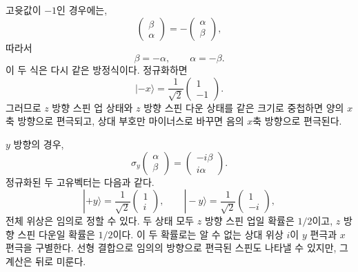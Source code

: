 고윳값이 \(-1\)인 경우에는,
\begin{equation}
\begin{pmatrix}
\beta\\
\alpha
\end{pmatrix}
=
-
\begin{pmatrix}
\alpha\\
\beta
\end{pmatrix},
\end{equation}
따라서
\begin{equation}
\beta=-\alpha,
\qquad
\alpha=-\beta.
\end{equation}
이 두 식은 다시 같은 방정식이다. 정규화하면
\begin{equation}
|-x\rangle
=
\frac{1}{\sqrt2}
\begin{pmatrix}
1\\
-1
\end{pmatrix}.
\end{equation}
그러므로 \(z\) 방향 스핀 업 상태와 \(z\) 방향 스핀 다운 상태를 같은 크기로 중첩하면 양의 \(x\)축 방향으로 편극되고, 상대 부호만 마이너스로 바꾸면 음의 \(x\)축 방향으로 편극된다.

\(y\) 방향의 경우,
\begin{equation}
\sigma_y
\begin{pmatrix}
\alpha\\
\beta
\end{pmatrix}
=
\begin{pmatrix}
-i\beta\\
i\alpha
\end{pmatrix}.
\end{equation}
정규화된 두 고유벡터는 다음과 같다.
\begin{equation}
|+y\rangle
=
\frac{1}{\sqrt2}
\begin{pmatrix}
1\\
i
\end{pmatrix},
\qquad
|-y\rangle
=
\frac{1}{\sqrt2}
\begin{pmatrix}
1\\
-i
\end{pmatrix},
\end{equation}
전체 위상은 임의로 정할 수 있다. 두 상태 모두 \(z\) 방향 스핀 업일 확률은 \(1/2\)이고, \(z\) 방향 스핀 다운일 확률은 \(1/2\)이다. 이 두 확률로는 알 수 없는 상대 위상 \(i\)이 \(y\) 편극과 \(x\) 편극을 구별한다. 선형 결합으로 임의의 방향으로 편극된 스핀도 나타낼 수 있지만, 그 계산은 뒤로 미룬다.

\begin{classroomqa}
\end{classroomqa}

